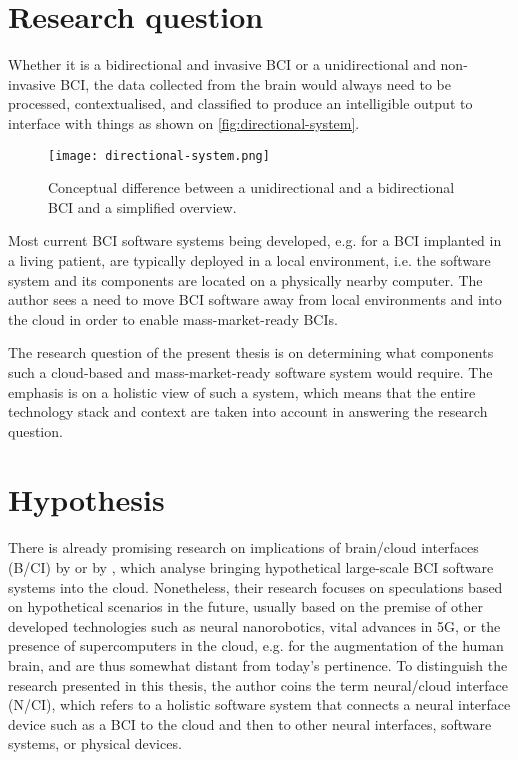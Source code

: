 \section{Research question}
\label{chapter1-research-question}

Whether it is a bidirectional and invasive BCI or a unidirectional and non-invasive BCI, the data collected from the brain would always need to be processed, contextualised, and classified to produce an intelligible output to interface with things as shown on \autoref{fig:directional-system}.

\begin{figure}[ht]
  \centering
  \texttt{[image: directional-system.png]}
  \caption{Conceptual difference between a unidirectional and a bidirectional BCI and a simplified overview.}
  \label{fig:directional-system}
\end{figure}

Most current BCI software systems being developed, e.g. for a BCI implanted in a living patient, are typically deployed in a local environment, i.e. the software system and its components are located on a physically nearby computer. The author sees a need to move BCI software away from local environments and into the cloud in order to enable mass-market-ready BCIs.

The research question of the present thesis is on determining what components such a cloud-based and mass-market-ready software system would require. The emphasis is on a holistic view of such a system, which means that the entire technology stack and context are taken into account in answering the research question.

\section{Hypothesis}
\label{chapter1-hypothesis}

There is already promising research on implications of brain/cloud interfaces (B/CI) by \citeauthor{martins_human_2019} \citeyearpar{martins_human_2019} or by \citeauthor{angelica_cognitive_2021} \citeyearpar{angelica_cognitive_2021}, which analyse bringing hypothetical large-scale BCI software systems into the cloud. Nonetheless, their research focuses on speculations based on hypothetical scenarios in the future, usually based on the premise of other developed technologies such as neural nanorobotics, vital advances in 5G, or the presence of supercomputers in the cloud, e.g. for the augmentation of the human brain, and are thus somewhat distant from today's pertinence. To distinguish the research presented in this thesis, the author coins the term neural/cloud interface (N/CI), which refers to a holistic software system that connects a neural interface device such as a BCI to the cloud and then to other neural interfaces, software systems, or physical devices.


